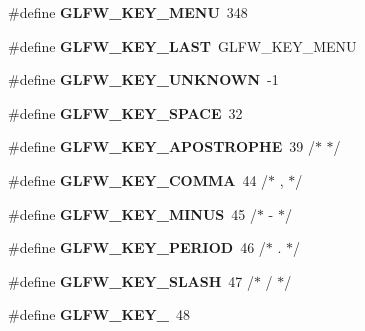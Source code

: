 \begin{DoxyCompactItemize}
\item 
\mbox{\label{group__keys_ga9845be48a745fc232045c9ec174d8820}} 
\#define {\bfseries G\+L\+F\+W\+\_\+\+K\+E\+Y\+\_\+\+M\+E\+NU}~348
\item 
\mbox{\label{group__keys_ga442cbaef7bfb9a4ba13594dd7fbf2789}} 
\#define {\bfseries G\+L\+F\+W\+\_\+\+K\+E\+Y\+\_\+\+L\+A\+ST}~G\+L\+F\+W\+\_\+\+K\+E\+Y\+\_\+\+M\+E\+NU
\item 
\mbox{\label{group__keys_ga99aacc875b6b27a072552631e13775c7}} 
\#define {\bfseries G\+L\+F\+W\+\_\+\+K\+E\+Y\+\_\+\+U\+N\+K\+N\+O\+WN}~-\/1
\item 
\mbox{\label{group__keys_gaddb2c23772b97fd7e26e8ee66f1ad014}} 
\#define {\bfseries G\+L\+F\+W\+\_\+\+K\+E\+Y\+\_\+\+S\+P\+A\+CE}~32
\item 
\mbox{\label{group__keys_ga6059b0b048ba6980b6107fffbd3b4b24}} 
\#define {\bfseries G\+L\+F\+W\+\_\+\+K\+E\+Y\+\_\+\+A\+P\+O\+S\+T\+R\+O\+P\+HE}~39  /$\ast$ \textquotesingle{} $\ast$/
\item 
\mbox{\label{group__keys_gab3d5d72e59d3055f494627b0a524926c}} 
\#define {\bfseries G\+L\+F\+W\+\_\+\+K\+E\+Y\+\_\+\+C\+O\+M\+MA}~44  /$\ast$ , $\ast$/
\item 
\mbox{\label{group__keys_gac556b360f7f6fca4b70ba0aecf313fd4}} 
\#define {\bfseries G\+L\+F\+W\+\_\+\+K\+E\+Y\+\_\+\+M\+I\+N\+US}~45  /$\ast$ -\/ $\ast$/
\item 
\mbox{\label{group__keys_ga37e296b650eab419fc474ff69033d927}} 
\#define {\bfseries G\+L\+F\+W\+\_\+\+K\+E\+Y\+\_\+\+P\+E\+R\+I\+OD}~46  /$\ast$ . $\ast$/
\item 
\mbox{\label{group__keys_gadf3d753b2d479148d711de34b83fd0db}} 
\#define {\bfseries G\+L\+F\+W\+\_\+\+K\+E\+Y\+\_\+\+S\+L\+A\+SH}~47  /$\ast$ / $\ast$/
\item 
\mbox{\label{group__keys_ga50391730e9d7112ad4fd42d0bd1597c1}} 
\#define {\bfseries G\+L\+F\+W\+\_\+\+K\+E\+Y\+\_}~48
\item 
\mbox{\label{group__keys_ga05e4cae9ddb8d40cf6d82c8f11f2502f}} 

\end{DoxyCompactItemize}
